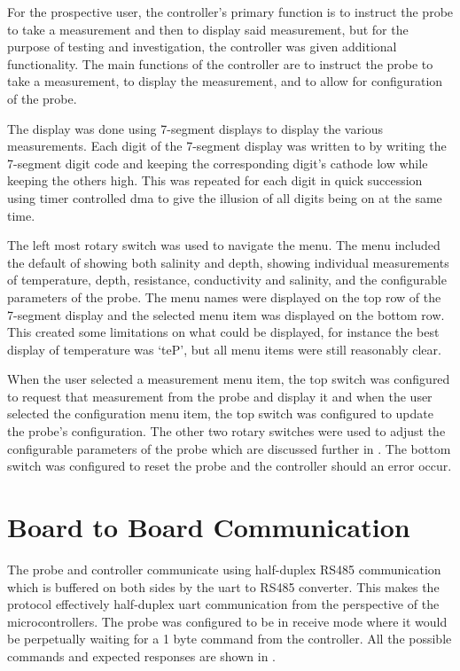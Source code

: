 For the prospective user, the controller's primary function is to instruct the probe to take a measurement and then to display said measurement, but for the purpose of testing and investigation, the controller was given additional functionality.
The main functions of the controller are to instruct the probe to take a measurement, to display the measurement, and to allow for configuration of the probe.

The display was done using 7-segment displays to display the various measurements.
Each digit of the 7-segment display was written to by writing the 7-segment digit code and keeping the corresponding digit's cathode low while keeping the others high.
This was repeated for each digit in quick succession using timer controlled \gls{dma} to give the illusion of all digits being on at the same time.

The left most rotary switch was used to navigate the menu.
The menu included the default of showing both salinity and depth, showing individual measurements of temperature, depth, resistance, conductivity and salinity, and the configurable parameters of the probe.
The menu names were displayed on the top row of the 7-segment display and the selected menu item was displayed on the bottom row.
This created some limitations on what could be displayed, for instance the best display of temperature was `teP', but all menu items were still reasonably clear.

When the user selected a measurement menu item, the top switch was configured to request that measurement from the probe and display it and when the user selected the configuration menu item, the top switch was configured to update the probe's configuration.
The other two rotary switches were used to adjust the configurable parameters of the probe which are discussed further in .
The bottom switch was configured to reset the probe and the controller should an error occur.

\section{Board to Board Communication}\label{sec:board-to-board-communication}

The probe and controller communicate using half-duplex RS485 communication which is buffered on both sides by the \gls{uart} to RS485 converter.
This makes the protocol effectively half-duplex \gls{uart} communication from the perspective of the microcontrollers.
The probe was configured to be in receive mode where it would be perpetually waiting for a 1 byte command from the controller.
All the possible commands and expected responses are shown in .

